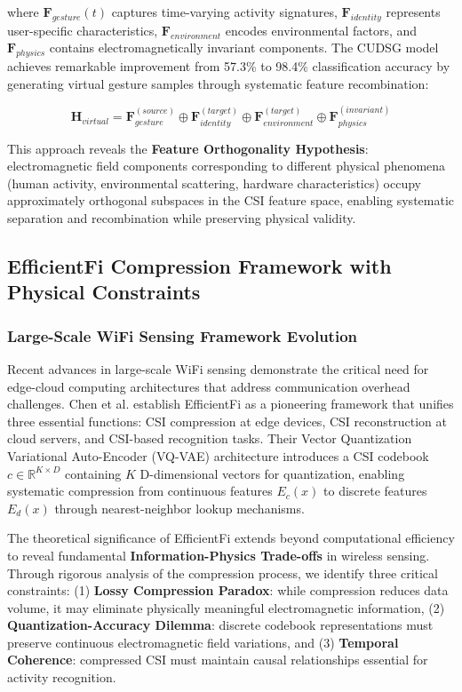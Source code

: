 \documentclass[journal]{IEEEtran}
\begin{document}
where $\mathbf{F}_{gesture}(t)$ captures time-varying activity signatures, $\mathbf{F}_{identity}$ represents user-specific characteristics, $\mathbf{F}_{environment}$ encodes environmental factors, and $\mathbf{F}_{physics}$ contains electromagnetically invariant components. The CUDSG model achieves remarkable improvement from 57.3\% to 98.4\% classification accuracy by generating virtual gesture samples through systematic feature recombination:

\begin{equation}
\mathbf{H}_{virtual} = \mathbf{F}_{gesture}^{(source)} \oplus \mathbf{F}_{identity}^{(target)} \oplus \mathbf{F}_{environment}^{(target)} \oplus \mathbf{F}_{physics}^{(invariant)}
\label{eq:virtual_sample_generation}
\end{equation}

This approach reveals the \textbf{Feature Orthogonality Hypothesis}: electromagnetic field components corresponding to different physical phenomena (human activity, environmental scattering, hardware characteristics) occupy approximately orthogonal subspaces in the CSI feature space, enabling systematic separation and recombination while preserving physical validity.

\subsection{EfficientFi Compression Framework with Physical Constraints}

\subsubsection{Large-Scale WiFi Sensing Framework Evolution}

Recent advances in large-scale WiFi sensing demonstrate the critical need for edge-cloud computing architectures that address communication overhead challenges. Chen et al. \cite{chen2024efficientfi} establish EfficientFi as a pioneering framework that unifies three essential functions: CSI compression at edge devices, CSI reconstruction at cloud servers, and CSI-based recognition tasks. Their Vector Quantization Variational Auto-Encoder (VQ-VAE) architecture introduces a CSI codebook $c \in \mathbb{R}^{K \times D}$ containing $K$ D-dimensional vectors for quantization, enabling systematic compression from continuous features $E_c(x)$ to discrete features $E_d(x)$ through nearest-neighbor lookup mechanisms.

The theoretical significance of EfficientFi extends beyond computational efficiency to reveal fundamental \textbf{Information-Physics Trade-offs} in wireless sensing. Through rigorous analysis of the compression process, we identify three critical constraints: (1) \textbf{Lossy Compression Paradox}: while compression reduces data volume, it may eliminate physically meaningful electromagnetic information, (2) \textbf{Quantization-Accuracy Dilemma}: discrete codebook representations must preserve continuous electromagnetic field variations, and (3) \textbf{Temporal Coherence}: compressed CSI must maintain causal relationships essential for activity recognition.
\end{document}
